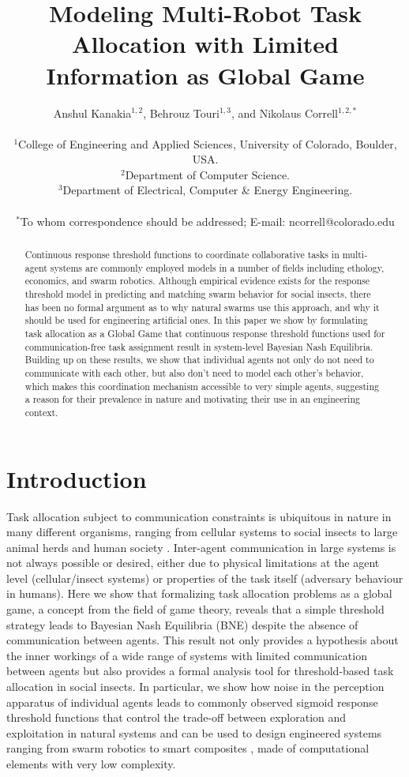 \documentclass[smallextended]{svjour3}       %
\title{Modeling Multi-Robot Task Allocation with Limited Information as Global Game}
\author
{Anshul Kanakia$^{1,2}$, Behrouz Touri$^{1,3}$, and Nikolaus Correll$^{1,2,\ast}$\\
\\
\normalsize{$^{1}$College of Engineering and Applied Sciences, University of Colorado, Boulder, USA. }\\
\normalsize{$^{2}$Department of Computer Science.}\\
\normalsize{$^{3}$Department of Electrical, Computer \& Energy Engineering.}\\
\\
\normalsize{$^\ast$To whom correspondence should be addressed; E-mail: ncorrell@colorado.edu}
}
\date{}
\begin{document}
 
\maketitle 
\begin{abstract}
Continuous response threshold functions to coordinate collaborative tasks in multi­agent systems are commonly employed models in a number of fields including ethology, economics, and swarm robotics. Although empirical evidence exists for the response threshold model in predicting and matching swarm behavior for social insects, there has been no formal argument as to why natural swarms use this approach, and why it should be used for engineering artificial ones. In this paper we show by formulating task allocation as a Global Game that continuous response threshold functions used for communication-­free task ­assignment result in system-­level Bayesian Nash Equilibria.  Building up on these results, we show that individual agents not only do not need to communicate with each other, but also don’t need to model each other's behavior, which makes this coordination mechanism accessible to very simple agents, suggesting a reason for their prevalence in nature and motivating their use in an engineering context.
\end{abstract}

\section{Introduction}
Task allocation subject to communication constraints is ubiquitous in nature in many different organisms, ranging from cellular systems \citep{Yoshida2010,Suzuki2015} to social insects \citep{Robinson1987,Gordon1996,Bonabeau1998,Theraulaz1998} to large animal herds \citep{Conradt2003,Conradt2005} and human society \citep{Raafat2009}. Inter-agent communication in large systems is not always possible or desired, either due to physical limitations at the agent level (cellular/insect systems) or properties of the task itself (adversary behaviour in humans). Here we show that formalizing task allocation problems as a global game, a concept from the field of game theory, reveals that a simple threshold strategy leads to Bayesian Nash Equilibria (BNE) despite the absence of communication between agents. This result not only provides a hypothesis about the inner workings of a wide range of systems with limited communication between agents but also provides a formal analysis tool for threshold-based task allocation in social insects. In particular, we show how noise in the perception apparatus of individual agents leads to commonly observed sigmoid response threshold functions that control the trade-off between exploration and exploitation \citep{Bonabeau1997} in natural systems and can be used to design engineered systems ranging from swarm robotics \citep{Martinoli1999,Krieger2000,Kube2000,Mataric2003,Gerkey2004} to smart composites \citep{McEvoy2015}, made of computational elements with very low complexity.
\end{document}
